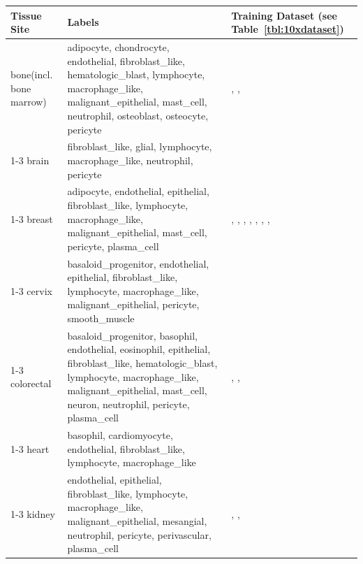 \documentclass[sn-mathphys-num]{sn-jnl}%
\theoremstyle{thmstyleone}%
\theoremstyle{thmstyletwo}%
\theoremstyle{thmstylethree}%
\begin{document}
	\begin{table}[t]%
		\footnotesize%
		\setlength{\tabcolsep}{6pt}%
		\renewcommand{\arraystretch}{1.2}%
		\label{tbl:10xdatasetlabel}%
		\begin{tabularx}{\linewidth}{p{9em} >{\raggedright\arraybackslash}X p{2.5cm}}%
			\toprule%
			\textbf{Tissue Site} & \textbf{Labels} & \textbf{Training Dataset (see Table~\ref{tbl:10xdataset})} \\
			\midrule[0.08em]%
			bone\hspace{9em}(incl. bone marrow) & adipocyte, chondrocyte, endothelial, fibroblast\_like, hematologic\_blast, lymphocyte, macrophage\_like, malignant\_epithelial, mast\_cell, neutrophil, osteoblast, osteocyte, pericyte &  \datasetref{bone-femur-normal}, \datasetref{bone-all-marrow}, \datasetref{bone-marrow-normal}\\
			\cmidrule(lr){1-3}
			brain & fibroblast\_like, glial, lymphocyte, macrophage\_like, neutrophil, pericyte &  \datasetref{brain-io}\\
			\cmidrule(lr){1-3}
			breast & adipocyte, endothelial, epithelial, fibroblast\_like, lymphocyte, macrophage\_like, malignant\_epithelial, mast\_cell, pericyte, plasma\_cell & \datasetref{breast-pan5k}, \datasetref{breast-entire-1}, \datasetref{breast-entire-2}, \datasetref{breast-predesigned-1}, \datasetref{breast-custom-idc}, \datasetref{breast-custom-1}, \datasetref{breast-predesigned-2}, \datasetref{breast-custom-2} \\
			\cmidrule(lr){1-3}
			cervix  & basaloid\_progenitor, endothelial, epithelial, fibroblast\_like, lymphocyte, macrophage\_like, malignant\_epithelial, pericyte, smooth\_muscle & \datasetref{cervix-pan5k} \\
			\cmidrule(lr){1-3}
			colorectal  & basaloid\_progenitor, basophil, endothelial, eosinophil, epithelial, fibroblast\_like, hematologic\_blast, lymphocyte, macrophage\_like, malignant\_epithelial, mast\_cell, neuron, neutrophil, pericyte, plasma\_cell & \datasetref{colon-cancer-preview}, \datasetref{colon-normal-preview}, \datasetref{colon-colorectal-io} \\
			\cmidrule(lr){1-3}
			heart & basophil, cardiomyocyte, endothelial, fibroblast\_like, lymphocyte, macrophage\_like & \datasetref{heart-mt} \\
			\cmidrule(lr){1-3}
			kidney & endothelial, epithelial, fibroblast\_like, lymphocyte, macrophage\_like, malignant\_epithelial, mesangial, neutrophil, pericyte, perivascular, plasma\_cell & \datasetref{kidney-cancer-preview}, \datasetref{kidney-normal-preview}, \datasetref{kidney-rcc-in-situ} \\

\end{tabularx}
\end{table}
\end{document}
